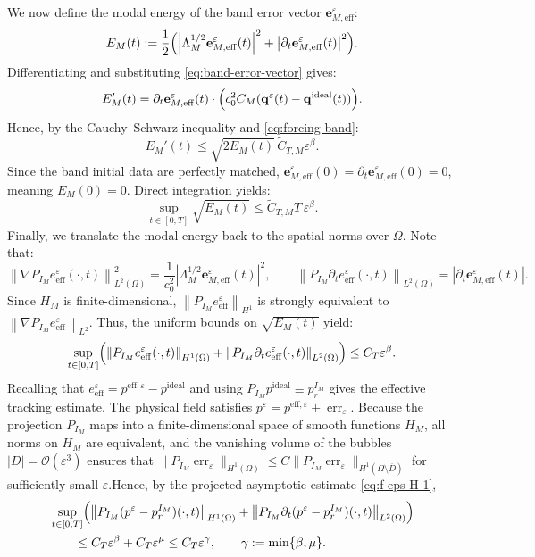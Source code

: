 \documentclass[11pt,a4paper]{article}
\numberwithin{equation}{section}
\newcommand{\veps}{\varepsilon}
\newcommand{\norm}[1]{\left\lVert #1 \right\rVert}
\newcommand{\abs}[1]{\left\lvert #1 \right\rvert}
\begin{document}
\noindent
We now define the modal energy of the band error vector $\mathbf{e}_{M,\mathrm{eff}}^\veps$:
\[
 E_M(t):=\frac12\Bigl(\abs{\Lambda_M^{1/2} \mathbf{e}_{M,\mathrm{eff}}^\veps(t)}^2+\abs{\partial_t\mathbf{e}_{M,\mathrm{eff}}^\veps(t)}^2\Bigr).
\]
Differentiating and substituting \eqref{eq:band-error-vector} gives:
\[
 E_M'(t)=\partial_t\mathbf{e}_{M,\mathrm{eff}}^\veps(t)\cdot\Bigl(c_0^2 C_M(\mathbf{q}^\veps(t)-\mathbf{q}^{\mathrm{ideal}}(t))\Bigr).
\]
Hence, by the Cauchy--Schwarz inequality and \eqref{eq:forcing-band}:
\[
 E_M'(t)\le \sqrt{2E_M(t)}\,\widetilde{C}_{T,M}\veps^\beta.
\]
Since the band initial data are perfectly matched, $\mathbf{e}_{M,\mathrm{eff}}^\veps(0)=\partial_t\mathbf{e}_{M,\mathrm{eff}}^\veps(0)=0$, meaning $E_M(0)=0$. Direct integration yields:
\[
 \sup_{t\in[0,T]}\sqrt{E_M(t)}\le \widetilde{C}_{T,M}T\,\veps^\beta.
\]
Finally, we translate the modal energy back to the spatial norms over $\Omega$. Note that:
\[
 \norm{\nabla P_{I_M} e_{\mathrm{eff}}^\veps(\cdot,t)}_{L^2(\Omega)}^2 = \frac{1}{c_0^2}\abs{\Lambda_M^{1/2}\mathbf{e}_{M,\mathrm{eff}}^\veps(t)}^2,
 \qquad
 \norm{P_{I_M}\partial_t e_{\mathrm{eff}}^\veps(\cdot,t)}_{L^2(\Omega)}=\abs{\partial_t\mathbf{e}_{M,\mathrm{eff}}^\veps(t)}.
\]
Since $H_M$ is finite-dimensional, $\norm{P_{I_M} e_{\mathrm{eff}}^\veps}_{H^1}$ is strongly equivalent to $\norm{\nabla P_{I_M} e_{\mathrm{eff}}^\veps}_{L^2}$. Thus, the uniform bounds on $\sqrt{E_M(t)}$ yield:
\begin{equation}
\label{eq:approx-ideal-estimate}
 \sup_{t\in[0,T]}
 \Bigl(
  \norm{P_{I_M} e_{\mathrm{eff}}^\veps(\cdot,t)}_{H^1(\Omega)}
  + \norm{P_{I_M}\partial_t e_{\mathrm{eff}}^\veps(\cdot,t)}_{L^2(\Omega)}
 \Bigr)
 \le C_T\veps^\beta.
\end{equation}
Recalling that $e_{\mathrm{eff}}^\veps = p^{\mathrm{eff},\veps} - p^{\mathrm{ideal}}$ and using $P_{I_M} p^{\mathrm{ideal}} \equiv p_r^{I_M}$ gives the effective tracking estimate. The physical field satisfies $p^\veps=p^{\mathrm{eff},\veps}+\operatorname{err}_{\veps}$. Because the projection $P_{I_M}$ maps into a finite-dimensional space of smooth functions $H_M$, all norms on $H_M$ are equivalent, and the vanishing volume of the bubbles $|D| = \mathcal{O}(\veps^3)$ ensures that $\|P_{I_M} \operatorname{err}_{\veps}\|_{H^1(\Omega)} \le C \|P_{I_M} \operatorname{err}_{\veps}\|_{H^1(\Omega \setminus \overline{D})}$ for sufficiently small $\veps$.Hence, by the projected asymptotic estimate \eqref{eq:f-eps-H-1},
\[
\begin{aligned}
&\sup_{t\in[0,T]}\Bigl(
  \norm{P_{I_M}(p^\veps-p_r^{I_M})(\cdot,t)}_{H^1(\Omega)}
  +\norm{P_{I_M}\partial_t(p^\veps-p_r^{I_M})(\cdot,t)}_{L^2(\Omega)}
\Bigr)\\
&\qquad\le C_T\veps^\beta+C_T\veps^\mu
\le C_T\veps^\gamma,\qquad \gamma:=\min\{\beta,\mu\}.
\end{aligned}
\]
\end{document}
